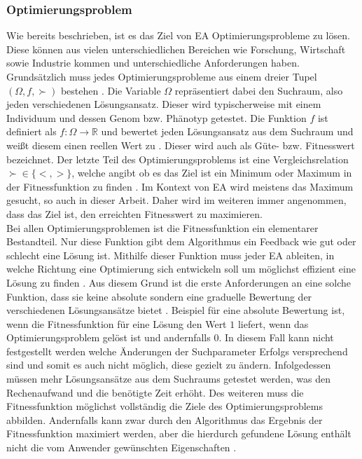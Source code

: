 \subsubsection{Optimierungsproblem}
\label{subsub:optimzation_problem}
Wie bereits beschrieben, ist es das Ziel von \ac{EA} Optimierungsprobleme zu lösen. Diese können aus vielen unterschiedlichen Bereichen wie Forschung, Wirtschaft sowie Industrie kommen \cite{weicker2015evolutionare} und unterschiedliche Anforderungen haben. Grundsätzlich muss jedes Optimierungsprobleme aus einem dreier Tupel $(\Omega, f, \succ)$ bestehen \cite{weicker2015evolutionare}. Die Variable $\Omega$ repräsentiert dabei den Suchraum, also jeden verschiedenen Lösungsansatz. Dieser wird typischerweise mit einem Individuum und dessen Genom bzw. Phänotyp getestet. Die Funktion $f$ ist definiert als $f: \Omega \rightarrow \mathbb{R}$ und bewertet jeden Lösungsansatz aus dem Suchraum und weißt diesem einen reellen Wert zu \cite{weicker2015evolutionare}. Dieser wird auch als Güte- bzw. Fitnesswert bezeichnet. Der letzte Teil des Optimierungsproblems ist eine Vergleichsrelation $\succ \in \{<, >\}$, welche angibt ob es das Ziel ist ein Minimum oder Maximum in der Fitnessfunktion zu finden \cite{weicker2015evolutionare}. Im Kontext von \ac{EA} wird meistens das Maximum gesucht, so auch in dieser Arbeit. Daher wird im weiteren immer angenommen, dass das Ziel ist, den erreichten Fitnesswert zu maximieren.\\
Bei allen Optimierungsproblemen ist die Fitnessfunktion ein elementarer Bestandteil. Nur diese Funktion gibt dem Algorithmus ein Feedback wie gut oder schlecht eine Lösung ist. Mithilfe dieser Funktion muss jeder \ac{EA} ableiten, in welche Richtung eine Optimierung sich entwickeln soll um möglichst effizient eine Lösung zu finden \cite{weicker2015evolutionare}. Aus diesem Grund ist die erste Anforderungen an eine solche Funktion, dass sie keine absolute sondern eine graduelle Bewertung der verschiedenen Lösungsansätze bietet \cite{weicker2015evolutionare}. Beispiel für eine absolute Bewertung ist, wenn die Fitnessfunktion für eine Lösung den Wert $1$ liefert, wenn das Optimierungsproblem gelöst ist und andernfalls $0$. In diesem Fall kann nicht festgestellt werden welche Änderungen der Suchparameter Erfolgs versprechend sind und somit es auch nicht möglich, diese gezielt zu ändern. Infolgedessen müssen mehr Lösungsansätze aus dem Suchraums getestet werden, was den Rechenaufwand und die benötigte Zeit erhöht. Des weiteren muss die Fitnessfunktion möglichst vollständig die Ziele des Optimierungsproblems abbilden. Andernfalls kann zwar durch den Algorithmus das Ergebnis der Fitnessfunktion maximiert werden, aber die hierdurch gefundene Lösung enthält nicht die vom Anwender gewünschten Eigenschaften \cite{weicker2015evolutionare}.

